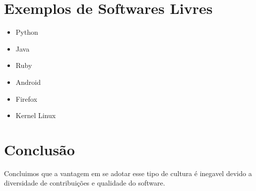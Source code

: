 \documentclass[12pt, onecolumn]{report}
\begin{document}
    \chapter{Exemplos de Softwares Livres}
        \begin{itemize}
            \item Python
            \item Java
            \item Ruby
            \item Android
            \item Firefox
            \item Kernel Linux
        \end{itemize}
        
    \chapter{Conclusão}
        \hspace{2cm} Concluimos que a vantagem em se adotar esse tipo de cultura é inegavel devido a diversidade de contribuições e qualidade do software.
\end{document}
